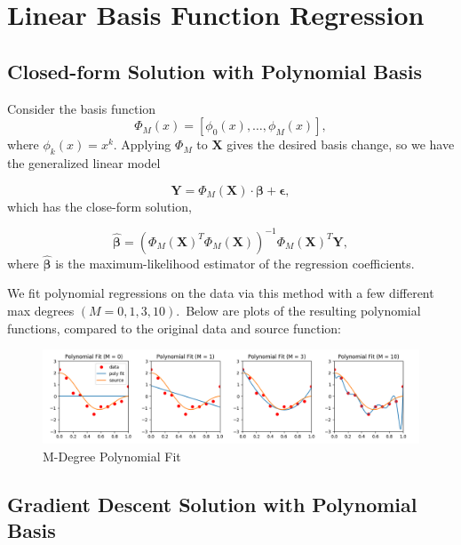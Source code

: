 \documentclass{article}
\begin{document}
\section{Linear Basis Function Regression}

\subsection{Closed-form Solution with Polynomial Basis}
Consider the basis function $$\Phi_M(x) = [\phi_0(x), \dots, \phi_M(x)],$$ where $\phi_k(x) = x^k$. Applying $\Phi_M$ to $\mathbf{X}$ gives the desired basis change, so we have the generalized linear model

$$\mathbf Y = \Phi_M(\mathbf X) \cdot \bm \beta + \bm \epsilon,$$
%
which has the close-form solution,

$$\hat{\bm \beta} = (\Phi_M(\mathbf X)^T \Phi_M(\mathbf X))^{-1} \Phi_M(\mathbf X)^T \mathbf Y,$$
%
where $\hat{\bm \beta}$ is the maximum-likelihood estimator of the regression coefficients.

We fit polynomial regressions on the data via this method with a few different max degrees $(M = 0, 1, 3, 10)$.\footnotemark\ Below are plots of the resulting polynomial functions, compared to the original data and source function:


\begin{figure}[H]
  \centering
  \includegraphics[width = 6.6in]{../P2/figs/part_1.png}
  \caption{M-Degree Polynomial Fit}
\end{figure}

\subsection{Gradient Descent Solution with Polynomial Basis}
\end{document}
